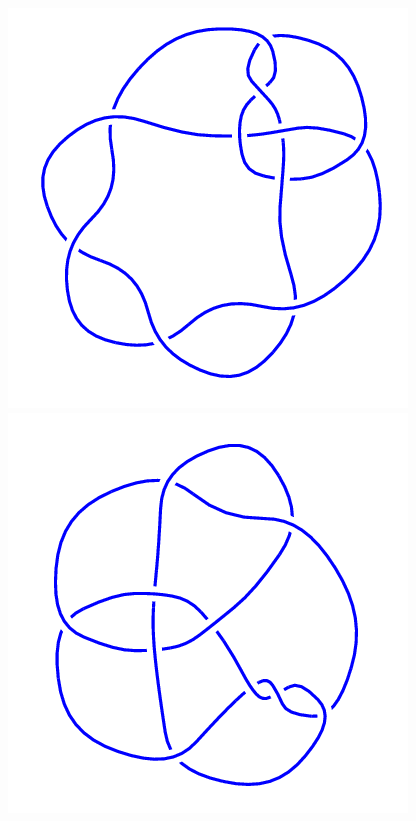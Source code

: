 \begin{figure}[H]
    \begin{minipage}[b]{.18\linewidth}
        \centering
        \includegraphics[width=\linewidth]{../data/10_82.png}
    \end{minipage}
    \begin{minipage}[b]{.18\linewidth}
        \centering
        \includegraphics[width=\linewidth]{../data/10_83.png}

\end{minipage}
\end{figure}
